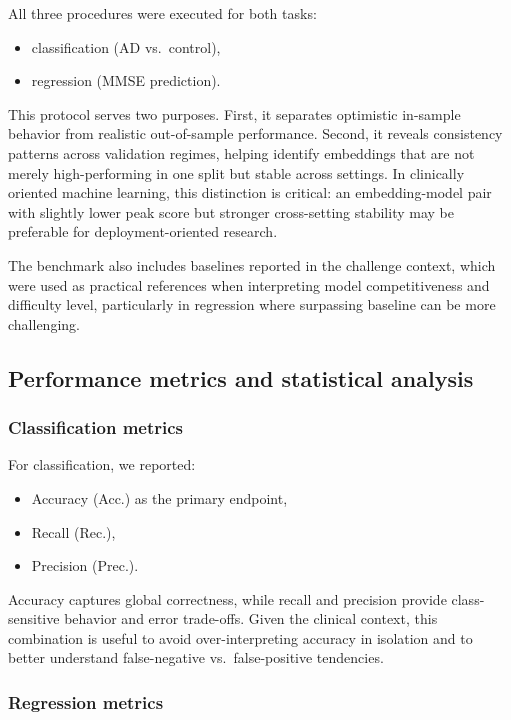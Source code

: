 \documentclass[final,5p,times]{elsarticle}
\begin{document}
All three procedures were executed for both tasks:

\begin{itemize}
    \item classification (AD vs.\ control),
    \item regression (MMSE prediction).
\end{itemize}

This protocol serves two purposes. First, it separates optimistic in-sample behavior from realistic out-of-sample performance. Second, it reveals consistency patterns across validation regimes, helping identify embeddings that are not merely high-performing in one split but stable across settings. In clinically oriented machine learning, this distinction is critical: an embedding-model pair with slightly lower peak score but stronger cross-setting stability may be preferable for deployment-oriented research.

The benchmark also includes baselines reported in the challenge context, which were used as practical references when interpreting model competitiveness and difficulty level, particularly in regression where surpassing baseline can be more challenging.

\subsection{Performance metrics and statistical analysis}

\subsubsection{Classification metrics}

For classification, we reported:

\begin{itemize}
    \item Accuracy (Acc.) as the primary endpoint,
    \item Recall (Rec.),
    \item Precision (Prec.).
\end{itemize}

Accuracy captures global correctness, while recall and precision provide class-sensitive behavior and error trade-offs. Given the clinical context, this combination is useful to avoid over-interpreting accuracy in isolation and to better understand false-negative vs.\ false-positive tendencies.

\subsubsection{Regression metrics}
\end{document}
